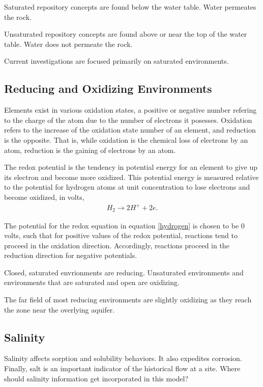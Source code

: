 \documentclass[letterpaper]{article}
\begin{document}
Saturated repository concepts are found below the water table. Water permeates 
the rock.

Unsaturated repository concepts are found above or near the top of the water 
table. Water does not permeate the rock.

Current investigations are focused primarily on saturated environments.

\subsection{Reducing and Oxidizing Environments\cite{mason_oxidation_1949}}

Elements exist in various oxidation states, a positive or negative number  
refering to the charge of the atom due to the number of electrons it posesses.
Oxidation refers to the increase of the oxidation state number of an element, 
and reduction is the opposite.  That is, while oxidation is the chemical loss of 
electrons by an atom, reduction is the gaining of electrons by an atom. 

The redox potential is the tendency in potential energy for an element to give 
up its electron and become more oxidized. This  potential energy is measured 
relative to the potential for hydrogen atoms at unit concentration to lose 
electrons and become oxidized, in volts,
\begin{align}
  H_2 \rightarrow 2H^+  + 2e.
  \label{hydrogen}
\end{align}

The potential for the redox equation in equation \eqref{hydrogen} is chosen to 
be 0 volts, such that for positive values of the redox potential, reactions tend 
to proceed in the oxidation direction. Accordingly, reactions proceed in
the reduction direction for negative potentials.

Closed, saturated envrionments are reducing. Unsaturated environments and 
environments that are saturated and open are oxidizing. 

The far field of most reducing environments are slightly oxidizing as they reach 
the zone near the overlying aquifer.

\subsection{Salinity}

Salinity affects sorption and solubility behaviors. It also expedites corrosion.  
Finally, salt is an important indicator of the historical flow at a site.  Where 
should salinity information get incorporated in this model?
\end{document}

